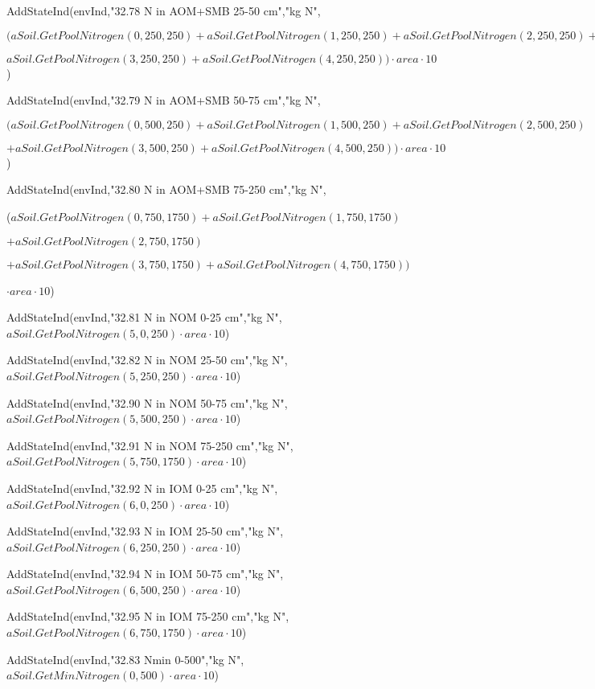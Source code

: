 \documentclass[%
]{scrartcl}
\begin{document}
{{{AddStateInd(envInd,"32.78 N in AOM+SMB 25-50 cm","kg N",
	   	
 $(aSoil.GetPoolNitrogen(0,250,250)+aSoil.GetPoolNitrogen(1,250,250)
+aSoil.GetPoolNitrogen(2,250,250)+$
	    
 $ aSoil.GetPoolNitrogen(3,250,250)+aSoil.GetPoolNitrogen(4,250,250)) 
\cdot area \cdot 10$)
		
AddStateInd(envInd,"32.79 N in AOM+SMB 50-75 cm","kg N",
	   	
 $(aSoil.GetPoolNitrogen(0,500,250)+aSoil.GetPoolNitrogen(1,500,250)
+aSoil.GetPoolNitrogen(2,500,250)$

$+	     
 aSoil.GetPoolNitrogen(3,500,250)+aSoil.GetPoolNitrogen(4,500,250)) 
\cdot area \cdot 10$)
		
AddStateInd(envInd,"32.80 N in AOM+SMB 75-250 cm","kg N",
	   	 
($aSoil.GetPoolNitrogen(0,750,1750)+aSoil.GetPoolNitrogen(1,750,1750)$

$+aSoil.GetPoolNitrogen(2,750,1750)$
	      
$+aSoil.GetPoolNitrogen(3,750,1750)+aSoil.GetPoolNitrogen(4,750,1750)) $

$\cdot area \cdot 10$)
		 
AddStateInd(envInd,"32.81 N in NOM 0-25 cm","kg N",
$aSoil.GetPoolNitrogen(5,0,250) \cdot area \cdot 10$)
		
AddStateInd(envInd,"32.82 N in NOM 25-50 cm","kg N",
$aSoil.GetPoolNitrogen(5,250,250) \cdot area \cdot 10$)
		
AddStateInd(envInd,"32.90 N in NOM 50-75 cm","kg N",
$aSoil.GetPoolNitrogen(5,500,250) \cdot area \cdot 10$)
		
AddStateInd(envInd,"32.91 N in NOM 75-250 cm","kg N",
$aSoil.GetPoolNitrogen(5,750,1750) \cdot area \cdot 10$)
		
AddStateInd(envInd,"32.92 N in IOM 0-25 cm","kg N",
$aSoil.GetPoolNitrogen(6,0,250) \cdot area \cdot 10$)
		
AddStateInd(envInd,"32.93 N in IOM 25-50 cm","kg N",
$aSoil.GetPoolNitrogen(6,250,250) \cdot area \cdot 10$)
		
AddStateInd(envInd,"32.94 N in IOM 50-75 cm","kg N",
$aSoil.GetPoolNitrogen(6,500,250) \cdot area \cdot 10$)
		 
AddStateInd(envInd,"32.95 N in IOM 75-250 cm","kg N",
$aSoil.GetPoolNitrogen(6,750,1750) \cdot area \cdot 10$)

  AddStateInd(envInd,"32.83 Nmin 0-500","kg N",
$aSoil.GetMinNitrogen(0,500) \cdot area \cdot 10$)
	
}}}
\end{document}

